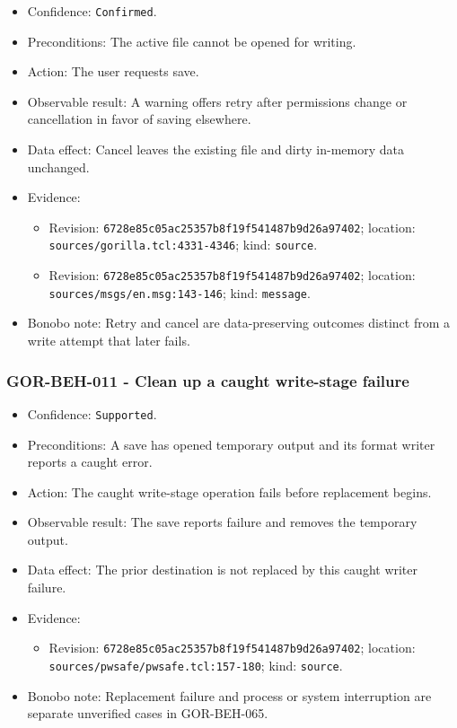 \documentclass[
  letterpaper,
]{article}
\newcommand{\passthrough}[1]{#1}
\providecommand{\tightlist}{%
  \setlength{\itemsep}{0pt}\setlength{\parskip}{0pt}}
\begin{document}
\begin{itemize}
\tightlist
\item
  Confidence: \passthrough{\lstinline!Confirmed!}.
\item
  Preconditions: The active file cannot be opened for writing.
\item
  Action: The user requests save.
\item
  Observable result: A warning offers retry after permissions change or cancellation in favor of saving elsewhere.
\item
  Data effect: Cancel leaves the existing file and dirty in-memory data unchanged.
\item
  Evidence:

  \begin{itemize}
  \tightlist
  \item
    Revision: \nolinkurl{6728e85c05ac25357b8f19f541487b9d26a97402}; location: \nolinkurl{sources/gorilla.tcl:4331-4346};
    kind: \passthrough{\lstinline!source!}.
  \item
    Revision: \nolinkurl{6728e85c05ac25357b8f19f541487b9d26a97402}; location: \nolinkurl{sources/msgs/en.msg:143-146};
    kind: \passthrough{\lstinline!message!}.
  \end{itemize}
\item
  Bonobo note: Retry and cancel are data-preserving outcomes distinct from a write attempt that later fails.
\end{itemize}

\subsubsection{GOR-BEH-011 - Clean up a caught write-stage
failure}\label{gor-beh-011---clean-up-a-caught-write-stage-failure}

\begin{itemize}
\tightlist
\item
  Confidence: \passthrough{\lstinline!Supported!}.
\item
  Preconditions: A save has opened temporary output and its format writer reports a caught error.
\item
  Action: The caught write-stage operation fails before replacement begins.
\item
  Observable result: The save reports failure and removes the temporary output.
\item
  Data effect: The prior destination is not replaced by this caught writer failure.
\item
  Evidence:

  \begin{itemize}
  \tightlist
  \item
    Revision: \nolinkurl{6728e85c05ac25357b8f19f541487b9d26a97402}; location:
    \nolinkurl{sources/pwsafe/pwsafe.tcl:157-180}; kind: \passthrough{\lstinline!source!}.
  \end{itemize}
\item
  Bonobo note: Replacement failure and process or system interruption are separate unverified cases in GOR-BEH-065.
\end{itemize}
\end{document}
